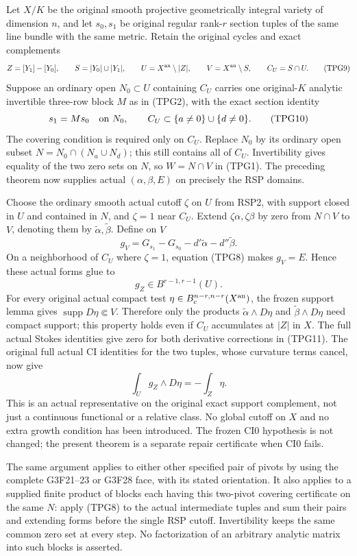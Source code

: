 Let $X/K$ be the original smooth projective geometrically integral
variety of dimension $n$, and let $s_0,s_1$ be original regular
rank-$r$ section tuples of the same line bundle with the same
metric.  Retain the original cycles and exact complements
\[
 Z=[Y_1]-[Y_0],\qquad S=|Y_0|\cup|Y_1|,\qquad
 U=X^{\rm an}\setminus|Z|,\qquad V=X^{\rm an}\setminus S,
 \qquad C_U=S\cap U.
 \tag{TPG9}
\]
Suppose an ordinary open $N_0\subset U$ containing $C_U$ carries
one original-$K$ analytic invertible three-row block $M$ as in
(TPG2), with the exact section identity
\[
              s_1=Ms_0\quad\hbox{on }N_0,
 \qquad C_U\subset\{a\ne0\}\cup\{d\ne0\}.
 \tag{TPG10}
\]
The covering condition is required only on $C_U$.  Replace $N_0$
by its ordinary open subset $N=N_0\cap(N_a\cup N_d)$; this
still contains all of $C_U$.  Invertibility gives equality of
the two zero sets on $N$, so $W=N\cap V$ in (TPG1).
The preceding theorem now supplies actual $(\alpha,\beta,E)$
on precisely the RSP domains.

Choose the ordinary smooth actual cutoff $\zeta$ on $U$ from
RSP2, with support closed in $U$ and contained in $N$, and
$\zeta=1$ near $C_U$.  Extend $\zeta\alpha,\zeta\beta$ by
zero from $N\cap V$ to $V$, denoting them by
$\widetilde\alpha,\widetilde\beta$.  Define on $V$
\[
        g_V=G_{s_1}-G_{s_0}-d'\widetilde\alpha-d''\widetilde\beta.
 \tag{TPG11}
\]
On a neighborhood of $C_U$ where $\zeta=1$, equation (TPG8)
makes $g_V=E$.  Hence these actual forms glue to
\[
                 g_Z\in B^{r-1,r-1}(U).
 \tag{TPG12}
\]
For every original actual compact test
$\eta\in B_c^{n-r,n-r}(X^{\rm an})$, the frozen support lemma
gives $\operatorname{supp}D\eta\Subset V$.  Therefore only the
products $\widetilde\alpha\wedge D\eta$ and
$\widetilde\beta\wedge D\eta$ need compact support; this
property holds even if $C_U$ accumulates at $|Z|$ in $X$.
The full actual Stokes identities give zero for both derivative
corrections in (TPG11).  The original full actual CI identities
for the two tuples, whose curvature terms cancel, now give
\[
                  \boxed{\displaystyle
                  \int_U g_Z\wedge D\eta=-\int_Z\eta.}
 \tag{TPG13}
\]
This is an actual representative on the original exact support
complement, not just a continuous functional or a relative class.
No global cutoff on $X$ and no extra growth condition has been
introduced.  The frozen CI0 hypothesis is not changed; the
present theorem is a separate repair certificate when CI0 fails.

The same argument applies to either other specified pair of
pivots by using the complete G3F21--23 or G3F28 face, with its stated
orientation.  It also applies to a supplied finite product of
blocks each having this two-pivot covering certificate on the
same $N$: apply (TPG8) to the actual intermediate tuples and
sum their pairs and extending forms before the single RSP
cutoff.  Invertibility keeps the same common zero set at every
step.  No factorization of an arbitrary analytic matrix into
such blocks is asserted.

